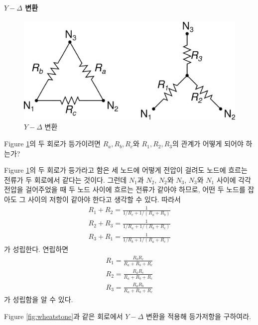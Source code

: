 \paragraph{$Y-\Delta$ 변환}
\begin{example}[$Y-\Delta$ 변환]
\begin{figure}[h]
\centering\includegraphics[scale=0.1]{Pictures/y-delta.png}
\caption{$Y-\Delta$  변환}
\label{fig:y-delta}
\end{figure}
Figure \ref{fig:y-delta}의 두 회로가 등가이려면 $R_a, R_b, R_c$와 $R_1, R_2, R_3$의 관계가 어떻게 되어야 하는가?
\end{example}
Figure \ref{fig:y-delta}의 두 회로가 등가라고 함은 세 노드에 어떻게 전압이 걸려도 노드에 흐르는 전류가 두 회로에서 같다는 것이다. 그런데 $N_1$과 $N_2$, $N_2$와 $N_3$, $N_3$와 $N_1$ 사이에 각각 전압을 걸어주었을 때 두 노드 사이에 흐르는 전류가 같아야 하므로, 어떤 두 노드를 잡아도 그 사이의 저항이 같아야 한다고 생각할 수 있다. 따라서
\begin{align}
R_1+R_2 =\frac{1}{1/R_c+1/(R_a+R_b)}\\
R_2+R_3=\frac{1}{1/R_a+1/(R_b+R_c)}\\
R_3+R_1= \frac{1}{1/R_b+1/(R_a+R_c)}
\end{align}
가 성립한다. 연립하면 
\begin{align}
R_1=\frac{R_bR_c}{R_a+R_b+R_c}\\
R_2=\frac{R_aR_c}{R_a+R_b+R_c}\\
R_3=\frac{R_aR_b}{R_a+R_b+R_c}
\end{align}
가 성립함을 알 수 있다.

\begin{exercise}
Figure \ref{fig:wheatstone}과 같은 회로에서 $Y-\Delta$ 변환을 적용해 등가저항을 구하여라.
\end{exercise}

